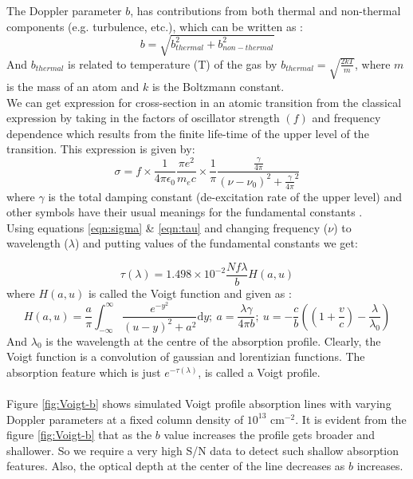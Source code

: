 The Doppler parameter $b$, has contributions from both thermal and non-thermal components (e.g. turbulence, etc.), which can be written as :
\begin{equation}
b=\sqrt{{b_{thermal}^2+b_{non-thermal}^2}}
\end{equation}
And $b_{thermal}$ is related to temperature (T) of the gas by $b_{thermal}=\sqrt{\frac{2kT}{m}}$, where $m$ is the mass of an atom and $k$ is the Boltzmann constant.
\\
We can get expression for cross-section in an atomic transition from the classical expression by taking in the factors of oscillator strength $(f)$ and frequency dependence which results from the finite life-time of the upper level of the transition. This expression is given by:
\begin{equation} \label{eqn:sigma}
\sigma=f \times \frac{1}{4\pi\epsilon_0} \frac{\pi e^2}{m_ec} \times \frac{1}{\pi} \frac{\frac{\gamma}{4\pi}}{{(\nu-\nu_0)}^2+{\frac{\gamma}{4\pi}}^2}
\end{equation}
where $\gamma$ is the total damping constant (de-excitation rate of the upper level) and other symbols have their usual meanings for the fundamental constants \citep{Voigt-eqn}. 
\\
Using equations \ref{eqn:sigma} \& \ref{eqn:tau} and changing frequency ($\nu$) to wavelength ($\lambda$) and putting values of the fundamental constants we get:

\begin{equation} \label{eqn:tau-lambda}
\tau(\lambda)=1.498 \times 10^{-2} \frac{Nf\lambda}{b} H(a,u)    
\end{equation}
where $H(a,u)$ is called the Voigt function and given as :
\begin{equation} \label{eqn:Voigt-func}
    H(a,u)=\frac{a}{\pi} \int_{-\infty}^{\infty} \frac{e^{-y^2}}{{(u-y)}^2+a^2} \text{d}y; \ a=\frac{\lambda \gamma}{4\pi b}; \ u=-\frac{c}{b}\left((1+\frac{v}{c})-\frac{\lambda}{\lambda_0}\right) 
\end{equation}
And $\lambda_0$ is the wavelength at the centre of the absorption profile. Clearly, the Voigt function is a convolution of gaussian and lorentizian functions. The absorption feature which is just $e^{-\tau(\lambda)}$, is called a Voigt profile.
\\\\
Figure \ref{fig:Voigt-b} shows simulated Voigt profile absorption lines with varying Doppler parameters at a fixed column density of $10^{13}$ cm$^{-2}$. It is evident from the figure \ref{fig:Voigt-b} that as the $b$ value increases the profile gets broader and shallower. So we require a very high S/N data to detect such shallow absorption features. Also, the optical depth at the center of the line decreases as $b$ increases. 


